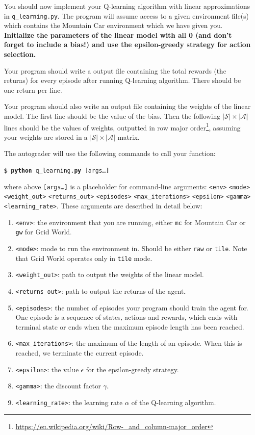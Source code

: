 \documentclass[11pt,addpoints,answers]{exam}
\begin{document}
You should now implement your Q-learning algorithm with linear approximations in \texttt{q\_learning.py}. The program will assume access to a given environment file(s) which contains the Mountain Car environment which we have given you.  \textbf{Initialize the parameters of the linear model with all 0 (and don't forget to include a bias!) and use the epsilon-greedy strategy for action selection.}

Your program should write a output file containing the total rewards (the returns) for every episode after running Q-learning algorithm. There should be one return per line.

Your program should also write an output file containing the weights of the linear model. The first line should be the value of the bias. Then the following $|\mathcal{S}| \times |\mathcal{A}|$ lines should be the values of weights, outputted in row major order\footnote{\url{https://en.wikipedia.org/wiki/Row-_and_column-major_order}}, assuming your weights are stored in a $|\mathcal{S}| \times |\mathcal{A}|$ matrix.

The autograder will use the following commands to call your function:

\begin{tabbing}
\=\texttt{\$ \textbf{python} q\_learning.\textbf{py} [args\dots]}
\end{tabbing}

where above \texttt{[args\dots]} is a placeholder for command-line arguments: \texttt{<env>} \texttt{<mode>} \texttt{<weight\_out>} \texttt{<returns\_out>} \texttt{<episodes>} \texttt{<max\_iterations>} \texttt{<epsilon>} \texttt{<gamma>} \texttt{<learning\_rate>}. These arguments are described in detail below:
\begin{enumerate}
    \item \texttt{<env>}: the environment that you are running, either \texttt{mc} for Mountain Car or \texttt{gw} for Grid World.
    \item \texttt{<mode>}: mode to run the environment in. Should be either \texttt{raw} or \texttt{tile}. Note that Grid World operates only in \texttt{tile} mode.
    \item \texttt{<weight\_out>}: path to output the weights of the linear model.
    \item \texttt{<returns\_out>}: path to output the returns of the agent.
    \item \texttt{<episodes>}: the number of episodes your program should train the agent for. One episode is a sequence of states, actions and rewards, which ends with terminal state or ends when the maximum episode length has been reached.
    \item \texttt{<max\_iterations>}: the maximum of the length of an episode. When this is reached, we terminate the current episode.
    \item \texttt{<epsilon>}: the value $\epsilon$ for the epsilon-greedy strategy.
    \item \texttt{<gamma>}: the discount factor $\gamma$.
    \item \texttt{<learning\_rate>}: the learning rate $\alpha$ of the Q-learning algorithm.
\end{enumerate}
\end{document}
